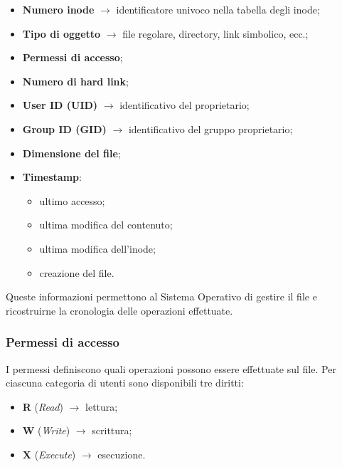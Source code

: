 \begin{itemize}
    \item \textbf{Numero inode} $\rightarrow$ identificatore univoco nella tabella degli inode;
    
    \item \textbf{Tipo di oggetto} $\rightarrow$ file regolare, directory, link simbolico, ecc.;
    
    \item \textbf{Permessi di accesso};
    
    \item \textbf{Numero di hard link};
    
    \item \textbf{User ID (UID)} $\rightarrow$ identificativo del proprietario;
    
    \item \textbf{Group ID (GID)} $\rightarrow$ identificativo del gruppo proprietario;
    
    \item \textbf{Dimensione del file};
    
    \item \textbf{Timestamp}:
    \begin{itemize}
        \item ultimo accesso;
        \item ultima modifica del contenuto;
        \item ultima modifica dell’inode;
        \item creazione del file.
    \end{itemize}
\end{itemize}

\medskip

\noindent Queste informazioni permettono al Sistema Operativo di gestire il file e ricostruirne la cronologia delle operazioni effettuate.

\bigskip

\subsubsection*{Permessi di accesso}
I permessi definiscono quali operazioni possono essere effettuate sul file.
Per ciascuna categoria di utenti sono disponibili tre diritti:

\begin{itemize}
    \item \textbf{R} (\textit{Read}) $\rightarrow$ lettura;
    
    \item \textbf{W} (\textit{Write}) $\rightarrow$ scrittura;
    
    \item \textbf{X} (\textit{Execute}) $\rightarrow$ esecuzione.
\end{itemize}

